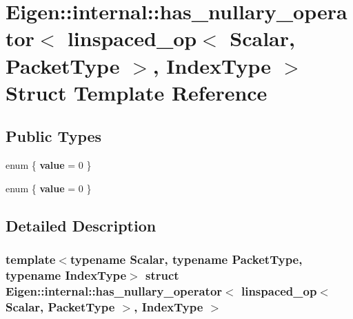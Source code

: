 \hypertarget{struct_eigen_1_1internal_1_1has__nullary__operator_3_01linspaced__op_3_01_scalar_00_01_packet_type_01_4_00_01_index_type_01_4}{}\section{Eigen\+:\+:internal\+:\+:has\+\_\+nullary\+\_\+operator$<$ linspaced\+\_\+op$<$ Scalar, Packet\+Type $>$, Index\+Type $>$ Struct Template Reference}
\label{struct_eigen_1_1internal_1_1has__nullary__operator_3_01linspaced__op_3_01_scalar_00_01_packet_type_01_4_00_01_index_type_01_4}
\subsection*{Public Types}
\begin{DoxyCompactItemize}
\item 
\mbox{\label{struct_eigen_1_1internal_1_1has__nullary__operator_3_01linspaced__op_3_01_scalar_00_01_packet_type_01_4_00_01_index_type_01_4_ad8f7b3edbd67893554cdea2a6a58afe1}} 
enum \{ {\bfseries value} = 0
 \}
\item 
\mbox{\label{struct_eigen_1_1internal_1_1has__nullary__operator_3_01linspaced__op_3_01_scalar_00_01_packet_type_01_4_00_01_index_type_01_4_a883d10839e324331de52f1f401aa206d}} 
enum \{ {\bfseries value} = 0
 \}
\end{DoxyCompactItemize}


\subsection{Detailed Description}
\subsubsection*{template$<$typename Scalar, typename Packet\+Type, typename Index\+Type$>$\newline
struct Eigen\+::internal\+::has\+\_\+nullary\+\_\+operator$<$ linspaced\+\_\+op$<$ Scalar, Packet\+Type $>$, Index\+Type $>$}



